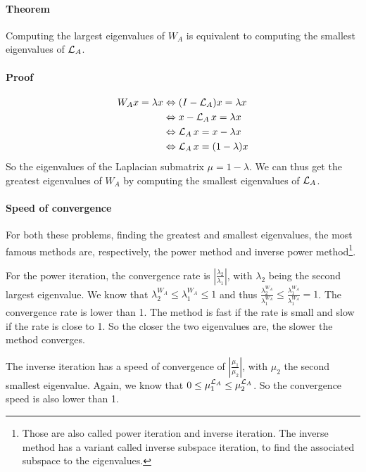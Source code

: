\paragraph{Theorem}
Computing the largest eigenvalues of \(W_A\) is equivalent to computing the smallest eigenvalues of \(\operatorname{\mathcal{L}}_A\).

\paragraph{Proof}
\begin{equation}
 \begin{split}
     W_A x = \lambda x & \Leftrightarrow (I - \operatorname{\mathcal{L}}_A)x = \lambda x \\
                     & \Leftrightarrow x - \operatorname{\mathcal{L}}_A x = \lambda x \\
                     & \Leftrightarrow \operatorname{\mathcal{L}}_A x = x - \lambda x \\
                     & \Leftrightarrow \operatorname{\mathcal{L}}_A x = (1 - \lambda) x
 \end{split}
\end{equation}
So the eigenvalues of the Laplacian submatrix \(\mu = 1 - \lambda\).
We can thus get the greatest eigenvalues of \(W_A\) by computing the smallest eigenvalues of \(\operatorname{\mathcal{L}}_A\).

\paragraph{Speed of convergence}
For both these problems, finding the greatest and smallest eigenvalues, the most famous methods are, respectively, the power method and inverse power method\footnote{Those are also called power iteration and inverse iteration. The inverse method has a variant called inverse subspace iteration, to find the associated subspace to the eigenvalues.}.

For the power iteration, the convergence rate is \(|\frac{\lambda_2}{\lambda_1}|\), with \(\lambda_2\) being the second largest eigenvalue.
We know that \(\lambda^{W_A}_2 \le \lambda^{W_A}_1 \le 1\) and thus \(\frac{\lambda^{W_A}_2}{\lambda^{W_A}_1} \le \frac{\lambda^{W_A}_1}{\lambda^{W_A}_1} = 1\).
The convergence rate is lower than 1.
The method is fast if the rate is small and slow if the rate is close to 1.
So the closer the two eigenvalues are, the slower the method converges.

The inverse iteration has a speed of convergence of \(|\frac{\mu_1}{\mu_2}|\), with \(\mu_2\) the second smallest eigenvalue.
Again, we know that \(0 \le \mu^{\operatorname{\mathcal{L}}_A}_1 \le \mu^{\operatorname{\mathcal{L}}_A}_2\).
So the convergence speed is also lower than 1.


